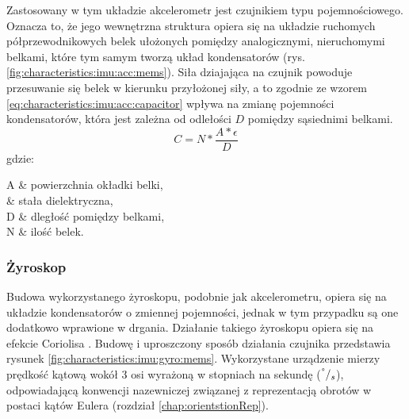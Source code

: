 	Zastosowany w tym układzie akcelerometr jest czujnikiem typu pojemnościowego. Oznacza to, że jego wewnętrzna struktura opiera się na układzie ruchomych półprzewodnikowych belek ułożonych pomiędzy analogicznymi, nieruchomymi belkami, które tym samym tworzą układ kondensatorów (rys. \ref{fig:characteristics:imu:acc:mems}). Siła dziajająca na czujnik powoduje przesuwanie się belek w kierunku przyłożonej siły, a to zgodnie ze wzorem \eqref{eq:characteristics:imu:acc:capacitor} wpływa na zmianę pojemności kondensatorów, która jest zależna od odlełości $D$ pomiędzy sąsiednimi belkami.
	\begin{equation}
		C = N * \frac{A * \epsilon}{D}
		\label{eq:characteristics:imu:acc:capacitor}
	\end{equation}
	gdzie:
	\begin{conditions}
		A & powierzchnia okładki belki,\\
		\epsilon			& stała dielektryczna,\\
		D			& dległość pomiędzy belkami,\\
		N	& ilość belek.\\
	\end{conditions}
	
	\subsubsection*{Żyroskop}
	Budowa wykorzystanego żyroskopu, podobnie jak akcelerometru, opiera się na układzie kondensatorów o zmiennej pojemności, jednak w tym przypadku są one dodatkowo wprawione w drgania. Działanie takiego żyroskopu opiera się na efekcie Coriolisa \cite{memsAccIdea2016}. Budowę i uproszczony sposób działania czujnika przedstawia rysunek \ref{fig:characteristics:imu:gyro:mems}. Wykorzystane urządzenie mierzy prędkość kątową wokół 3 osi wyrażoną w stopniach na sekundę ($^\degree/_s$), odpowiadającą konwencji nazewniczej związanej z reprezentacją obrotów w postaci kątów Eulera (rozdział \ref{chap:orientstionRep}). 
	

